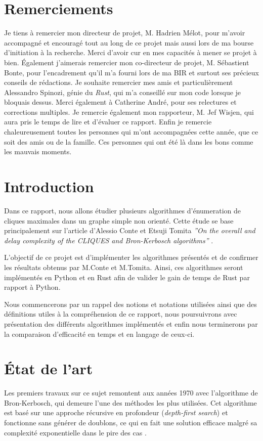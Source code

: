 \documentclass[12pt,a4paper]{article}
\begin{document}
\section*{Remerciements}

Je tiens à remercier mon directeur de projet, M. Hadrien Mélot, pour m'avoir accompagné et encouragé tout au long de ce projet mais aussi lors de ma bourse d'initiation à la recherche. Merci d'avoir cur en mes capacités à mener se projet à bien. Également j'aimerais remercier mon co-directeur de projet, M. Sébastient Bonte, pour l'encadrement qu'il m'a fourni lors de ma BIR et surtout ses précieux conseils de rédactions. Je souhaite remercier mes amis et particulièrement Alessandro Spinozi, génie du \emph{Rust}, qui m'a conseillé sur mon code lorsque je bloquais dessus. Merci également à Catherine André, pour ses relectures et corrections multiples. Je remercie également mon rapporteur, M. Jef Wisjen, qui aura pris le temps de lire et d'évaluer ce rapport.
Enfin je remercie chaleureusement toutes les personnes qui m'ont accompagnées cette année, que ce soit des amis ou de la famille. Ces personnes qui ont été là dans les bons comme les mauvais moments.


\newpage
\tableofcontents

\newpage

\section{Introduction}


Dans ce rapport, nous allons étudier plusieurs algorithmes d'énumeration de cliques maximales dans un graphe simple non orienté. Cette étude se base principalement sur l'article d'Alessio Conte et Etsuji Tomita  \textit{''On the overall and delay complexity of the CLIQUES and Bron-Kerbosch algorithms''} \cite{CONTE20221}.

L'objectif de ce projet est d'implémenter les algorithmes présentés et de confirmer les résultats obtenus par M.Conte et M.Tomita. Ainsi, ces algorithmes seront implémentés en Python et en Rust afin de valider le gain de temps de Rust par rapport à Python.

Nous commencerons par un rappel des notions et notations utilisées ainsi que des définitions utiles à la compréhension de ce rapport, nous poursuivrons avec présentation des différents algorithmes implémentés et enfin nous terminerons par la comparaison d'efficacité en temps et en langage de ceux-ci.


\section{État de l'art}%
\label{sec:etat}
Les premiers travaux sur ce sujet remontent aux années 1970 avec l'algorithme de Bron-Kerbosch\cite{bron1973algorithm}, qui demeure l'une des méthodes les plus utilisées. Cet algorithme est basé sur une approche récursive en profondeur (\textit{depth-first search}) et fonctionne sans générer de doublons, ce qui en fait une solution efficace malgré sa complexité exponentielle dans le pire des cas .
\end{document}
